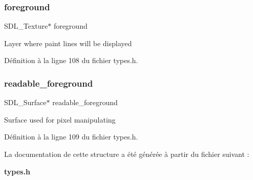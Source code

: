 \subsubsection{foreground}
{\footnotesize\ttfamily S\+D\+L\+\_\+\+Texture$\ast$ foreground}

Layer where paint lines will be displayed 

Définition à la ligne 108 du fichier types.\+h.

\mbox{\label{struct_screen_ada24f13ca94adc152b2a1a58473405c0}} 
\subsubsection{readable\+\_\+foreground}
{\footnotesize\ttfamily S\+D\+L\+\_\+\+Surface$\ast$ readable\+\_\+foreground}

Surface used for pixel manipulating 

Définition à la ligne 109 du fichier types.\+h.



La documentation de cette structure a été générée à partir du fichier suivant \+:\begin{DoxyCompactItemize}
\item 
\textbf{ types.\+h}\end{DoxyCompactItemize}
